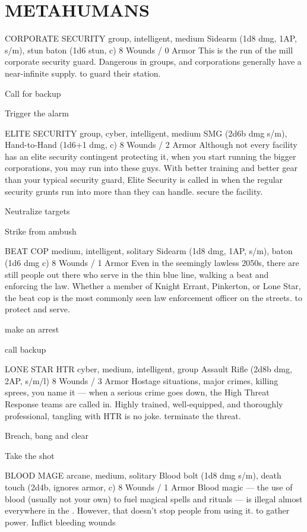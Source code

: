 \documentclass[oneside,10pt]{article}
\begin{document}
\section{METAHUMANS}
\begin{multicols}{2}

\critterspec
{CORPORATE SECURITY	 }
{group, intelligent, medium }
{Sidearm (1d8 dmg, 1AP, s/m), stun baton (1d6 stun, c) }
{8 Wounds / 0 Armor }
{This is the run of the mill corporate security guard. Dangerous in groups, and corporations generally have a near-infinite supply.}
{to guard their station. }
{\tcirc{} Call for backup 

\tcirc{} Trigger the alarm }

\critterspec
{ELITE SECURITY	}
{group, cyber, intelligent, medium }
{SMG (2d6b dmg s/m), Hand-to-Hand (1d6+1 dmg, c) }
{8 Wounds / 2 Armor }
{Although not every facility has an elite security contingent protecting it, when you start running the bigger corporations, you may run into these guys. With better training and better gear than your typical security guard, Elite Security is called in when the regular security grunts run into more than they can handle. }
{secure the facility. }
{\tcirc{} Neutralize targets 

\tcirc{} Strike from ambush }

\critterspec
{BEAT COP }
{medium, intelligent, solitary }
{Sidearm (1d8 dmg, 1AP, s/m), baton (1d6 dmg c) }
{8 Wounds / 1 Armor }
{Even in the seemingly lawless 2050s, there are still people out there who serve in the thin blue line, walking a beat and enforcing the law. Whether a member of Knight Errant, Pinkerton, or Lone Star, the beat cop is the most commonly seen law enforcement officer on the streets. }
{to protect and serve. }
{\tcirc{} make an arrest 

\tcirc{} call backup}

\critterspec
{LONE STAR HTR		}
{cyber, medium, intelligent, group}
{Assault Rifle (2d8b dmg, 2AP, s/m/l)}
{8 Wounds / 3 Armor}
{Hostage situations, major crimes, killing sprees, you name it — when a serious crime goes down, the High Threat Response teams are called in. Highly trained, well-equipped, and thoroughly professional, tangling with HTR is no joke.}
{terminate the threat.}
{\tcirc{} Breach, bang and clear

\tcirc{} Take the shot}

\critterspec
{BLOOD MAGE	}
{arcane, medium, solitary}
{Blood bolt (1d8 dmg s/m), death touch (2d4b, ignores armor, c)}
{8 Wounds / 1 Armor}
{Blood magic — the use of blood (usually not your own) to fuel magical spells and rituals — is illegal almost everywhere in the \SW{}. However, that doesn’t stop people from using it.}
{to gather power.}
{  \tcirc{} Inflict bleeding wounds}


\end{multicols}
\end{document}
